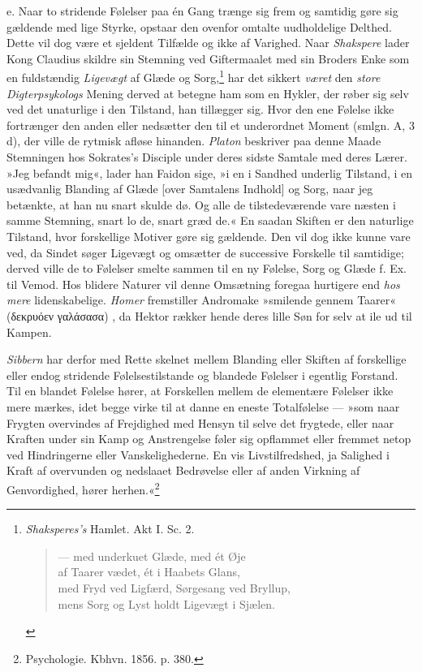 \documentclass[12pt,a4paper,openany]{book}
\newcommand{\opage}[1]{\marginnote{\footnotesize\textit{[#1]}}}
\begin{document}
e. Naar to stridende Følelser paa én Gang trænge sig frem og samtidig
gøre sig gældende med lige Styrke, opstaar den ovenfor omtalte
uudholdelige Delthed. Dette vil dog være et sjeldent Tilfælde og ikke af
Varighed. Naar \emph{Shakspere} lader Kong Claudius skildre sin Stemning
ved Giftermaalet med sin Broders Enke som en fuldstændig \emph{Ligevægt}
af Glæde og Sorg,\footnote[1]{\emph{Shaksperes’s} Hamlet. Akt I. Sc. 2.
\begin{verse}
--- med underkuet Glæde, med ét Øje\\
af Taarer vædet, ét i Haabets Glans,\\
med Fryd ved Ligfærd, Sørgesang ved Bryllup,\\
mens Sorg og Lyst holdt Ligevægt i Sjælen.
\end{verse}} har det sikkert \emph{været} den \emph{store
Digterpsykologs} Mening derved at betegne ham som en Hykler, der røber
sig selv ved det unaturlige i den Tilstand, han tillægger sig. Hvor den
ene Følelse ikke fortrænger den anden eller nedsætter den til et
underordnet Moment (smlgn. A, 3 d), der ville de rytmisk afløse
hinanden. \emph{Platon} beskriver paa denne Maade Stemningen hos
Sokrates’s Disciple under deres sidste Samtale med deres Lærer. »Jeg
befandt mig«, lader han Faidon sige, »i en i Sandhed underlig Tilstand,
i en usædvanlig Blanding af Glæde [over Samtalens Indhold] og Sorg, naar
jeg betænkte, at han nu snart skulde dø. Og alle de tilstedeværende vare
næsten i samme Stemning, snart lo de, snart græd de.« En saadan Skiften
er den naturlige Tilstand, hvor forskellige Motiver gøre sig gældende.
Den vil dog ikke kunne vare ved, da Sindet søger Ligevægt og omsætter de
successive Forskelle til samtidige; derved ville de to Følelser smelte
sammen til en ny Følelse, Sorg og Glæde f. Ex. til Vemod. Hos blidere
Naturer vil denne Omsætning foregaa hurtigere end \emph{hos mere}
lidenskabelige. \emph{Homer} fremstiller Andromake »smilende
\opage{288}gennem Taarer« (δεκρυόεν γαλάσασα)%
, da Hektor rækker hende
deres lille Søn for selv at ile ud til Kampen.

\emph{Sibbern} har derfor med Rette skelnet mellem Blanding eller
Skiften af forskellige eller endog stridende Følelsestilstande og
blandede Følelser i egentlig Forstand. Til en blandet Følelse hører, at
Forskellen mellem de elementære Følelser ikke mere mærkes, idet begge
virke til at danne en eneste Totalfølelse --- »som naar Frygten
overvindes af Frejdighed med Hensyn til selve det frygtede, eller naar
Kraften under sin Kamp og Anstrengelse føler sig opflammet eller fremmet
netop ved Hindringerne eller Vanskelighederne. En vis Livstilfredshed,
ja Salighed i Kraft af overvunden og nedslaaet Bedrøvelse eller af anden
Virkning af Genvordighed, hører herhen.«\footnote[1]{Psychologie. Kbhvn.
1856. p. 380.}
\end{document}
